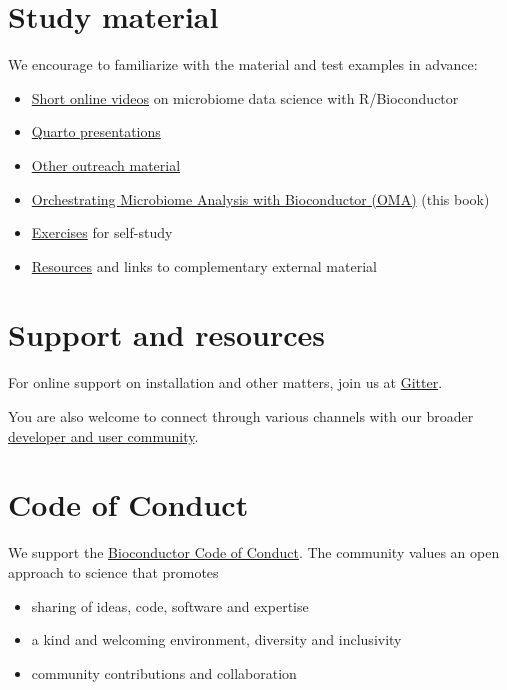 \documentclass[
]{book}
\providecommand{\tightlist}{%
  \setlength{\itemsep}{0pt}\setlength{\parskip}{0pt}}
\begin{document}
\hypertarget{material}{%
\section{Study material}\label{material}}

We encourage to familiarize with the material and test examples in advance:

\begin{itemize}
\item
  \href{https://www.youtube.com/playlist?list=PLjiXAZO27elAJEptP59BN3whVJ61XIkST}{Short online videos} on microbiome data science with R/Bioconductor
\item
  \href{https://microbiome.github.io/outreach/index.html}{Quarto presentations}
\item
  \href{https://github.com/microbiome/outreach}{Other outreach material}
\item
  \href{https://microbiome.github.io/OMA/}{Orchestrating Microbiome Analysis with Bioconductor (OMA)} (this book)
\item
  \protect\hyperlink{exercises}{Exercises} for self-study
\item
  \protect\hyperlink{resources}{Resources} and links to complementary external material
\end{itemize}

\hypertarget{support-and-resources}{%
\section{Support and resources}\label{support-and-resources}}

For online support on installation and other matters, join us at
\href{https://gitter.im/microbiome/miaverse?utm_source=badge\&utm_medium=badge\&utm_campaign=pr-badge\&utm_content=badge}{Gitter}.

You are also welcome to connect through various channels with our
broader \href{https://microbiome.github.io}{developer and user community}.

\hypertarget{coc}{%
\section{Code of Conduct}\label{coc}}

We support the \href{https://bioconductor.github.io/bioc_coc_multilingual/}{Bioconductor Code of Conduct}. The community values an open approach to science that promotes

\begin{itemize}
\tightlist
\item
  sharing of ideas, code, software and expertise
\item
  a kind and welcoming environment, diversity and inclusivity
\item
  community contributions and collaboration
\end{itemize}
\end{document}

